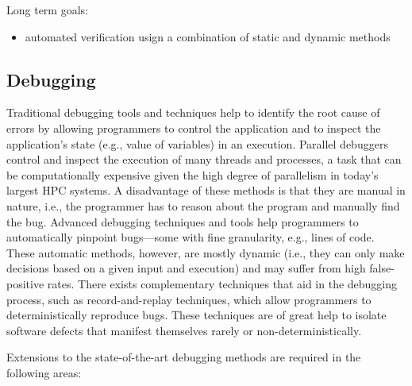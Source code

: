 Long term goals:
\begin{itemize}
\item  automated verification usign a  combination of static and dynamic methods
\end{itemize}

\fi 

\subsection{Debugging}
\label{sec:debugging}


Traditional debugging tools and techniques help to identify the root cause of errors by allowing programmers to control the application and to inspect the application’s state (e.g., value of variables) in an execution. Parallel debuggers control and inspect the execution of many threads and processes, a task that can be computationally expensive given the high degree of parallelism in today’s largest HPC systems. A disadvantage of these methods is that they are manual in nature, i.e., the programmer has to reason about the program and manually find the bug. Advanced debugging techniques and tools help programmers to automatically pinpoint bugs---some with fine granularity, e.g., lines of code. These automatic methods, however, are mostly dynamic (i.e., they can only make decisions based on a given input and execution) and may suffer from high false-positive rates. There exists complementary techniques that aid in the debugging process, such as record-and-replay techniques, which allow programmers to deterministically reproduce bugs. These techniques are of great help to isolate software defects that manifest themselves rarely or non-deterministically. %

Extensions to the state-of-the-art debugging methods are required in the following areas:

